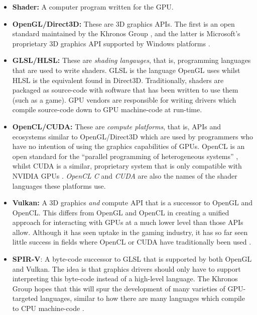 \documentclass[a4paper,12pt,twoside,openright]{report}
\begin{document}
\begin{itemize}

    \item \textbf{Shader:} A computer program written for the GPU.

    \item \textbf{OpenGL/Direct3D:} These are 3D graphics APIs. The first is an
    open standard maintained by the Khronos Group \cite{OpenGL}, and the latter
    is Microsoft's proprietary 3D graphics API supported by Windows platforms
    \cite{Direct3D}.

    \item \textbf{GLSL/HLSL:} These are \textit{shading langauges}, that is,
    programming languages that are used to write shaders. GLSL is the language
    OpenGL uses whilst HLSL is the equivalent found in Direct3D. Traditionally,
    shaders are packaged as source-code with software that has been written to
    use them (such as a game). GPU vendors are responsible for writing drivers
    which compile source-code down to GPU machine-code at run-time.

    \item \textbf{OpenCL/CUDA:} These are \textit{compute platforms}, that is,
    APIs and ecosystems similar to OpenGL/Direct3D which are used by
    programmers who have no intention of using the graphics capabilities of
    GPUs. OpenCL is an open standard for the ``parallel programming of
    heterogeneous systems'' \cite{OpenCL}, whilst CUDA is a similar,
    proprietary system that is only compatible with NVIDIA GPUs \cite{CUDA}.
    \textit{OpenCL C} and \textit{CUDA} are also the names of the shader
    languages these platforms use.

    \item \textbf{Vulkan:} A 3D graphics \textit{and} compute API \cite{Vulkan}
    that is a successor to OpenGL and OpenCL. This differs from OpenGL and
    OpenCL in creating a unified approach for interacting with GPUs at a much
    lower level than those APIs allow. Although it has seen uptake in the gaming
    industry, it has so far seen little success in fields where OpenCL or CUDA
    have traditionally been used \cite{TODO}.

    \item \textbf{SPIR-V}: A byte-code successor to GLSL that is supported by
    both OpenGL and Vulkan. The idea is that graphics drivers should only have
    to support interpreting this byte-code instead of a high-level language.
    The Khronos Group hopes that this will spur the development of many
    varieties of GPU-targeted languages, similar to how there are many
    languages which compile to CPU machine-code \cite{TODO}.


\end{itemize}
\end{document}
